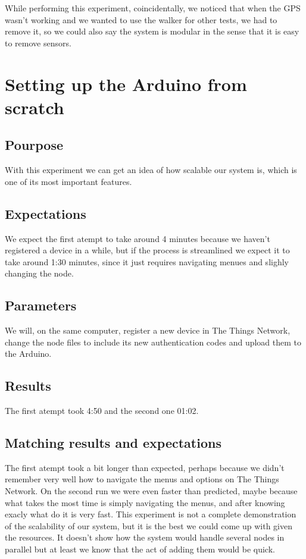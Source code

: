 	While performing this experiment, coincidentally, we noticed that when the GPS wasn't working and we wanted to use the walker for other tests, we had to remove it, so we could also say the system is modular in the sense that it is easy to remove sensors.

\section{Setting up the Arduino from scratch}

	\subsection{Pourpose}
		With this experiment we can get an idea of how scalable our system is, which is one of its most important features.
	\subsection{Expectations}
		We expect the first atempt to take around 4 minutes because we haven't registered a device in a while, but if the process is streamlined we expect it to take around 1:30 minutes, since it just requires navigating menues and slighly changing the node.
	\subsection{Parameters}
		We will, on the same computer, register a new device in The Things Network, change the node files to include its new authentication codes and upload them to the Arduino.
	\subsection{Results}
		The first atempt took 4:50 and the second one 01:02.
	\subsection{Matching results and expectations}
		The first atempt took a bit longer than expected, perhaps because we didn't remember very well how to navigate the menus and options on The Things Network. On the second run we were even faster than predicted, maybe because what takes the most time is simply navigating the menus, and after knowing exacly what do it is very fast. This experiment is not a complete demonstration of the scalability of our system, but it is the best we could come up with given the resources. It doesn't show how the system would handle several nodes in parallel but at least we know that the act of adding them would be quick.

